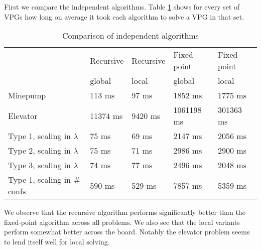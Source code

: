 First we compare the independent algorithms. Table \ref{tab_compare_independent_algs} shows for every set of VPGs how long on average it took each algorithm to solve a VPG in that set.
\begin{table}[h]
	\centering
	\begin{tabular}{|l|l|l|l|l|}
		\hline
		& Recursive &Recursive & Fixed-point & Fixed-point\\
		& global & local & global & local \\
		\hline
		Minepump& 113 ms& 97 ms& 1852 ms& 1775 ms\\ \hline
		Elevator& 11374 ms& 9420 ms& 1061198 ms& 301363 ms\\ \hline
		Type 1, scaling in $\lambda$& 75 ms& 69 ms& 2147 ms& 2056 ms\\ \hline
		Type 2, scaling in $\lambda$& 75 ms& 71 ms& 2986 ms& 2900 ms\\ \hline
		Type 3, scaling in $\lambda$& 74 ms& 77 ms& 2496 ms& 2048 ms\\ \hline
		Type 1, scaling in \# confs& 590 ms& 529 ms& 7857 ms& 5359 ms\\ \hline
	\end{tabular}
	\caption{Comparison of independent algorithms}
	\label{tab_compare_independent_algs}
\end{table}
We observe that the recursive algorithm performs significantly better than the fixed-point algorithm across all problems. We also see that the local variants perform somewhat better across the board. Notably the elevator problem seems to lend itself well for local solving.

